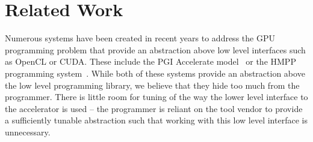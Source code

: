 
\section{Related Work}

% 
% 
% 

Numerous systems have been created in recent years to address the GPU
programming problem that provide an abstraction above low level interfaces such
as OpenCL or CUDA. These include the PGI Accelerate model~\cite{pgi-accelerate}
or the HMPP programming system~\cite{hmpp}. While both of these systems provide
an abstraction above the low level programming library, we believe that they
hide too much from the programmer. There is little room for tuning of the way
the lower level interface to the accelerator is used -- the programmer is
reliant on the tool vendor to provide a sufficiently tunable abstraction such
that working with this low level interface is unnecessary. 

